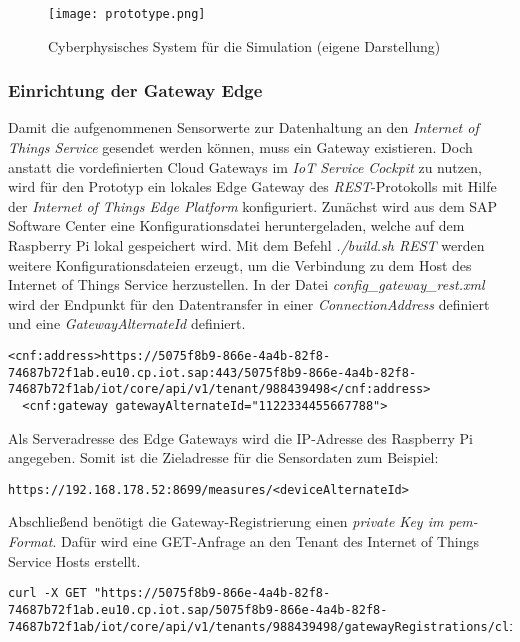 \begin{figure}[H]
  \centering
  \texttt{[image: prototype.png]}
  \caption[Cyberphysisches System für die Simulation]{Cyberphysisches System für die Simulation (eigene Darstellung)}
  \label{raspi}
\end{figure}


\subsubsection{Einrichtung der Gateway Edge}

Damit die aufgenommenen Sensorwerte zur Datenhaltung an den \textit{Internet of Things Service} gesendet werden können, muss ein Gateway existieren. Doch anstatt die vordefinierten Cloud Gateways im \textit{IoT Service Cockpit} zu nutzen, wird für den Prototyp ein lokales Edge Gateway des \textit{REST}-Protokolls mit Hilfe der \textit{Internet of Things Edge Platform} konfiguriert. Zunächst wird aus dem SAP Software Center eine Konfigurationsdatei heruntergeladen, welche auf dem Raspberry Pi lokal gespeichert wird. Mit dem Befehl \textit{./build.sh REST} werden weitere Konfigurationsdateien erzeugt, um die Verbindung zu dem Host des Internet of Things Service herzustellen. In der Datei \textit{config\_gateway\_rest.xml} wird der Endpunkt für den Datentransfer in einer \textit{ConnectionAddress} definiert und eine \textit{GatewayAlternateId} definiert.

\begin{lstlisting}[caption= Gateway-Verbindung zur Cloud]
  <cnf:address>https://5075f8b9-866e-4a4b-82f8-74687b72f1ab.eu10.cp.iot.sap:443/5075f8b9-866e-4a4b-82f8-74687b72f1ab/iot/core/api/v1/tenant/988439498</cnf:address>
  <cnf:gateway gatewayAlternateId="1122334455667788">
\end{lstlisting}
Als Serveradresse des Edge Gateways wird die IP-Adresse des Raspberry Pi angegeben. Somit ist die Zieladresse für die Sensordaten zum Beispiel:

\begin{lstlisting}[caption= Zieladresse für Sensorwerte]
  https://192.168.178.52:8699/measures/<deviceAlternateId>\end{lstlisting}

\noindent Abschließend benötigt die Gateway-Registrierung einen \textit{private Key im pem-Format}. Dafür wird eine GET-Anfrage an den Tenant des Internet of Things Service Hosts erstellt.

\begin{lstlisting}[caption= GET-Anfrage für einen Client-Key]
curl -X GET "https://5075f8b9-866e-4a4b-82f8-74687b72f1ab.eu10.cp.iot.sap/5075f8b9-866e-4a4b-82f8-74687b72f1ab/iot/core/api/v1/tenants/988439498/gatewayRegistrations/clientCertificate/pem\end{lstlisting}

